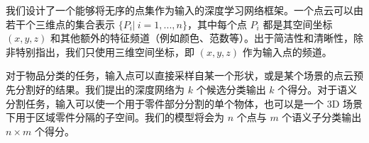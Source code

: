 \label{sec:problem}
\begin{comment}
\todo{
  \begin{enumerate}
    \item we are interested in deep learning methods for object classification and segmentation on 3d point sets.
    \item we solve the two problems in a unified framework. in this framework, we use neural network to learn a function $f$ that takes a subset of points in $\R^3$ as input, and predicts the object recognition or per-point segmentation.  
  \end{enumerate}
}
\end{comment}

我们设计了一个能够将无序的点集作为输入的深度学习网络框架。一个点云可以由若干个三维点的集合表示 $\{P_i| \ i=1,...,n\}$，其中每个点 $P_i$ 都是其空间坐标 $(x,y,z)$ 和其他额外的特征频道（例如颜色、范数等）。出于简洁性和清晰性，除非特别指出，我们只使用三维空间坐标，即 $(x,y,z)$ 作为输入点的频道。


对于物品分类的任务，输入点可以直接采样自某一个形状，或是某个场景的点云预先分割好的结果。我们提出的深度网络为 $k$ 个候选分类输出 $k$ 个得分。对于语义分割任务，输入可以使一个用于零件部分分割的单个物体，也可以是一个 3D 场景下用于区域零件分隔的子空间。我们的模型将会为 $n$ 个点与 $m$ 个语义子分类输出  $n \times m$ 个得分。



